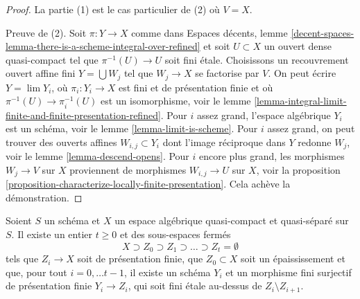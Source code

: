 \begin{proof}
La partie (1) est le cas particulier de (2) où $V = X$.

\medskip\noindent
Preuve de (2). Soit $\pi : Y \to X$ comme dans Espaces décents, lemme
\ref{decent-spaces-lemma-there-is-a-scheme-integral-over-refined}
et soit $U \subset X$ un ouvert dense quasi-compact tel que
$\pi^{-1}(U) \to U$ soit fini étale.
Choisissons un recouvrement ouvert affine fini $Y = \bigcup W_j$ tel que
$W_j \to X$ se factorise par $V$. On peut écrire $Y = \lim Y_i$, où
$\pi_i : Y_i \to X$ est fini et de présentation finie et où
$\pi^{-1}(U) \to \pi_i^{-1}(U)$ est un isomorphisme, voir le
lemme \ref{lemma-integral-limit-finite-and-finite-presentation-refined}.
Pour $i$ assez grand, l'espace algébrique $Y_i$ est un schéma, voir le
lemme \ref{lemma-limit-is-scheme}.
Pour $i$ assez grand, on peut trouver des ouverts affines $W_{i, j} \subset Y_i$
dont l'image réciproque dans $Y$ redonne $W_j$, voir le
lemme \ref{lemma-descend-opens}.
Pour $i$ encore plus grand, les morphismes $W_j \to V$ sur $X$ proviennent
de morphismes $W_{i, j} \to U$ sur $X$, voir la proposition
\ref{proposition-characterize-locally-finite-presentation}.
Cela achève la démonstration.
\end{proof}

\begin{lemma}
\label{lemma-there-is-a-scheme-finite-over-filtered}
Soient $S$ un schéma et $X$ un espace algébrique quasi-compact et quasi-séparé
sur $S$. Il existe un entier $t \geq 0$ et des
sous-espaces fermés
$$
X \supset Z_0 \supset Z_1 \supset \ldots \supset Z_t = \emptyset
$$
tels que $Z_i \to X$ soit de présentation finie,
que $Z_0 \subset X$ soit un épaississement et que, pour tout $i = 0, \ldots t - 1$,
il existe un schéma $Y_i$ et un morphisme fini surjectif de
présentation finie $Y_i \to Z_i$, qui soit fini étale au-dessus de
$Z_i \setminus Z_{i + 1}$.
\end{lemma}

